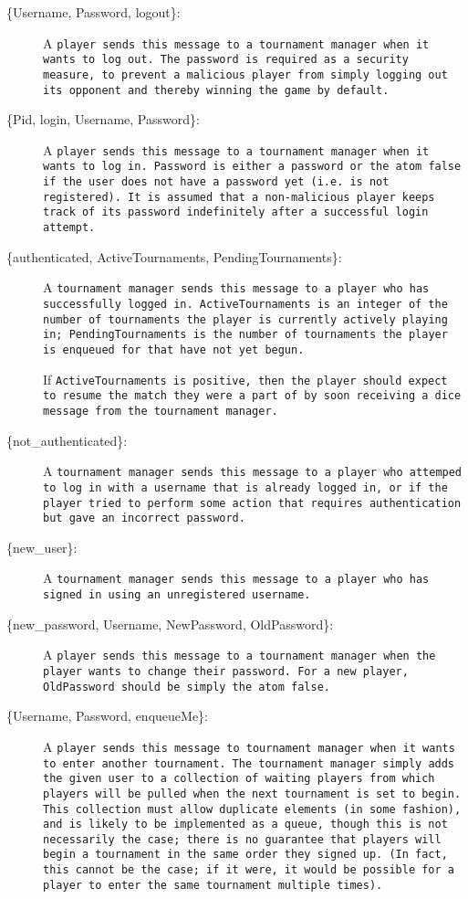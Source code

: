 \documentclass[12pt,letterpaper]{article}
\newcommand{\tm}{\tt{tournament manager}}
\newcommand{\pl}{\tt{player}}
\begin{document}
\begin{description}
\item[\{Username, Password, logout\}:] A \pl{} sends this message to a \tm{} when it wants to log out.  The password is required as a security measure, to prevent a malicious player from simply logging out its opponent and thereby winning the game by default.

\item[\{Pid, login, Username, Password\}:] A \pl{} sends this message to a \tm{} when it wants to log in.  Password is either a password or the atom \tt{false} if the user does not have a password yet (i.e. is not registered).  It is assumed that a non-malicious \pl{} keeps track of its password indefinitely after a successful login attempt.

\item[\{authenticated, ActiveTournaments, PendingTournaments\}:] A \tm{} sends this message to a \pl{} who has successfully logged in.  \tt{ActiveTournaments} is an integer of the number of tournaments the \pl{} is currently actively playing in; \tt{PendingTournaments} is the number of tournaments the \pl{} is enqueued for that have not yet begun.

If \tt{ActiveTournaments} is positive, then the player should expect to resume the match they were a part of by soon receiving a \tt{dice} message from the tournament manager.

\item[\{not\_authenticated\}:] A \tm{} sends this message to a \pl{} who attemped to log in with a username that is already logged in, or if the \pl{} tried to perform some action that requires authentication but gave an incorrect password.

\item[\{new\_user\}:] A \tm{} sends this message to a \pl{} who has signed in using an unregistered username.

\item[\{new\_password, Username, NewPassword, OldPassword\}:] A \pl{} sends this message to a \tm{} when the \pl{} wants to change their password.  For a new player, \tt{OldPassword} should be simply the atom \tt{false}.

\item[\{Username, Password, enqueueMe\}:] A \pl{} sends this message to \tm{} when it wants to enter another tournament.  The \tm{} simply adds the given user to a collection of waiting players from which players will be pulled when the next tournament is set to begin.  This collection must allow duplicate elements (in some fashion), and is likely to be implemented as a queue, though this is not necessarily the case; there is no guarantee that players will begin a tournament in the same order they signed up.  (In fact, this cannot be the case; if it were, it would be possible for a player to enter the same tournament multiple times).


\end{description}
\end{document}
